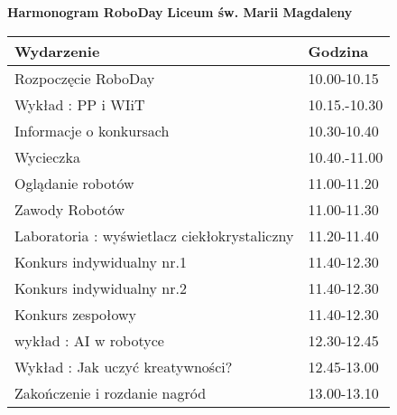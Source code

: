 \documentclass{article}
\begin{document}
\begin{center}
\Large\textbf{Harmonogram RoboDay}
\large\textbf{Liceum św. Marii Magdaleny}
\end{center}
\vspace{1cm}
\begin{center}
\begin{tabular}{|l|l|}
\hline
\textbf{Wydarzenie} & \textbf{Godzina} \\
\hline
Rozpoczęcie RoboDay & 10.00-10.15 \\
\hline
Wykład : PP i WIiT & 10.15.-10.30 \\
\hline
Informacje o konkursach & 10.30-10.40 \\
\hline
Wycieczka & 10.40.-11.00 \\
\hline
Oglądanie robotów & 11.00-11.20 \\
\hline
Zawody Robotów & 11.00-11.30 \\
\hline
Laboratoria : wyświetlacz ciekłokrystaliczny & 11.20-11.40 \\
\hline
Konkurs indywidualny nr.1 & 11.40-12.30 \\
\hline
Konkurs indywidualny nr.2 & 11.40-12.30 \\
\hline
Konkurs zespołowy & 11.40-12.30 \\
\hline
wykład : AI w robotyce & 12.30-12.45 \\
\hline
Wykład : Jak uczyć kreatywności? & 12.45-13.00 \\
\hline
Zakończenie i rozdanie nagród & 13.00-13.10 \\
\hline
\end{tabular}
\end{center}
\end{document}

